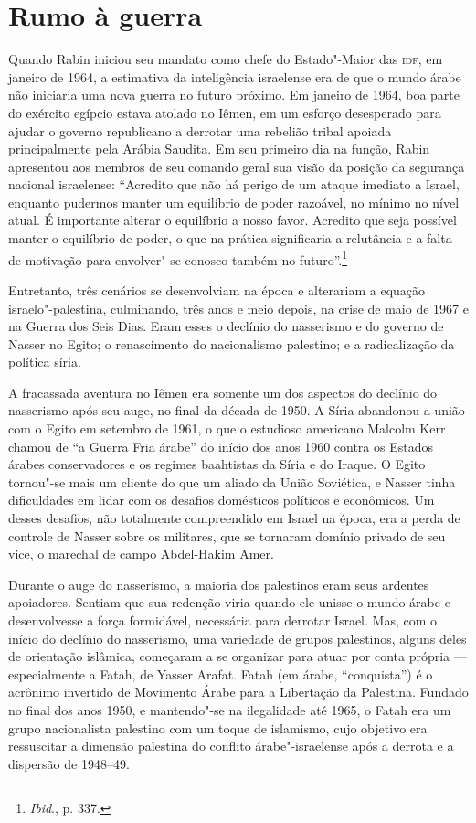 \section{Rumo à guerra}

Quando Rabin iniciou seu mandato como chefe do Estado"-Maior das \textsc{idf}, em
janeiro de 1964, a estimativa da inteligência israelense era de que o
mundo árabe não iniciaria uma nova guerra no futuro próximo. Em janeiro
de 1964, boa parte do exército egípcio estava atolado no Iêmen, em um
esforço desesperado para ajudar o governo republicano a derrotar uma
rebelião tribal apoiada principalmente pela Arábia Saudita. Em seu
primeiro dia na função, Rabin apresentou aos membros de seu comando
geral sua visão da posição da segurança nacional israelense: ``Acredito
que não há perigo de um ataque imediato a Israel, enquanto pudermos
manter um equilíbrio de poder razoável, no mínimo no nível atual. É
importante alterar o equilíbrio a nosso favor. Acredito que seja
possível manter o equilíbrio de poder, o que na prática significaria a
relutância e a falta de motivação para envolver"-se conosco também no
futuro''.\footnote{\emph{Ibid}., p. 337.}

Entretanto, três cenários se desenvolviam na época e alterariam a
equação israelo"-palestina, culminando, três anos e meio depois, na crise
de maio de 1967 e na Guerra dos Seis Dias. Eram esses o declínio do
nasserismo e do governo de Nasser no Egito; o renascimento do
nacionalismo palestino; e a radicalização da política síria.

A fracassada aventura no Iêmen era somente um dos aspectos do declínio
do nasserismo após seu auge, no final da década de 1950. A Síria
abandonou a união com o Egito em setembro de 1961, o que o
estudioso americano Malcolm Kerr chamou de ``a Guerra Fria árabe'' do
início dos anos 1960 contra os Estados árabes conservadores e os regimes
baahtistas da Síria e do Iraque. O Egito tornou"-se mais um cliente do que
um aliado da União Soviética, e Nasser tinha dificuldades em lidar com
os desafios domésticos políticos e econômicos. Um desses desafios, não
totalmente compreendido em Israel na época, era a perda de controle de
Nasser sobre os militares, que se tornaram domínio privado de seu vice,
o marechal de campo Abdel-Hakim Amer.

Durante o auge do nasserismo, a maioria dos palestinos eram seus
ardentes apoiadores. Sentiam que sua redenção viria quando ele
unisse o mundo árabe e desenvolvesse a força formidável, necessária para
derrotar Israel. Mas, com o início do declínio do nasserismo, uma
variedade de grupos palestinos, alguns deles de orientação islâmica,
começaram a se organizar para atuar por conta própria --- especialmente a
Fatah, de Yasser Arafat. Fatah (em árabe, ``conquista'') é o acrônimo
invertido de Movimento Árabe para a Libertação da Palestina. Fundado no
final dos anos 1950, e mantendo"-se na ilegalidade até 1965, o Fatah era
um grupo nacionalista palestino com um toque de islamismo, cujo objetivo
era ressuscitar a dimensão palestina do conflito árabe"-israelense após a
derrota e a dispersão de 1948--49.

